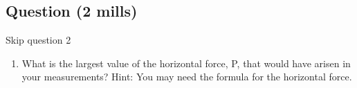 \documentclass{article}
\begin{document}
\subsection*{Question (2 mills)} 
Skip question 2

\begin{enumerate}
\item What is the largest value of the horizontal force, P, that would have arisen in your measurements? Hint: You may need the formula for the horizontal force.


\end{enumerate}
\end{document}

